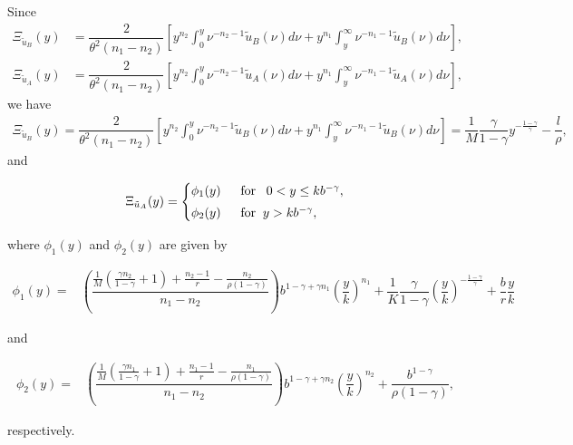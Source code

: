 \documentclass[a4paper,report, 11pt]{article}
\def\g{\gamma}
\def\t{\theta}
\begin{document}
{Since 
\begin{align*}
\Xi_{\tilde{u}_B}(y)&=\dfrac{2}{\t^2(n_1-n_2)}\left[y^{n_2}\int_0^y \nu^{-n_2-1}\tilde{u}_B(\nu)d\nu +y^{n_1}\int_y^\infty \nu^{-n_1-1}\tilde{u}_B(\nu)d\nu\right],\\
\Xi_{\tilde{u}_A}(y)&=\dfrac{2}{\t^2(n_1-n_2)}\left[y^{n_2}\int_0^y \nu^{-n_2-1}\tilde{u}_A(\nu)d\nu +y^{n_1}\int_y^\infty \nu^{-n_1-1}\tilde{u}_A(\nu)d\nu\right],
\end{align*}
we have 
\begin{align*}
\Xi_{\tilde{u}_B}(y)=\dfrac{2}{\t^2(n_1-n_2)}\left[y^{n_2}\int_0^y \nu^{-n_2-1}\tilde{u}_B(\nu)d\nu +y^{n_1}\int_y^\infty \nu^{-n_1-1}\tilde{u}_B(\nu)d\nu\right]=\dfrac{1}{M}\dfrac{\g}{1-\g}y^{-\frac{1-\g}{\g}}-\dfrac{l}{\rho},
\end{align*}
and
\begin{footnotesize}
	\begin{eqnarray}
	\begin{split}
	\Xi_{\tilde{u}_A}(y)=
	\begin{cases}
	\phi_1(y)	\;\;&\mbox{for}\;\;\;0<y\le kb^{-\g}, \vspace{1mm}\\
	\phi_2(y)\;\;&\mbox{for}\;\;y>kb^{-\g},
	\end{cases}
	\end{split}
	\end{eqnarray}
\end{footnotesize}
where $\phi_1(y)$ and $\phi_2(y)$ are given by 
\begin{footnotesize}
	\begin{align*}
	\phi_1(y)=&\left(\dfrac{\frac{1}{M}\left(\frac{\g n_2}{1-\g}+1\right)+\frac{n_2-1}{r}-\frac{n_2}{\rho(1-\g)}}{n_1-n_2}\right)b^{1-\g+\g n_1}\left(\dfrac{y}{k}\right)^{n_1}+\dfrac{1}{K}\dfrac{\g}{1-\g}(\dfrac{y}{k})^{-\frac{1-\g}{\g}}+\dfrac{b}{r}\dfrac{y}{k}
	\end{align*}
\end{footnotesize}
and 
\begin{footnotesize}
	\begin{align*}
	\phi_2(y)=& \left(\dfrac{\frac{1}{M}\left(\frac{\g n_1}{1-\g}+1\right)+\frac{n_1-1}{r}-\frac{n_1}{\rho(1-\g)}}{n_1-n_2}\right)b^{1-\g+\g n_2}\left(\dfrac{y}{k}\right)^{n_2}+\dfrac{b^{1-\g}}{\rho(1-\g)},
	\end{align*}
\end{footnotesize}
respectively. 

}
\end{document}
